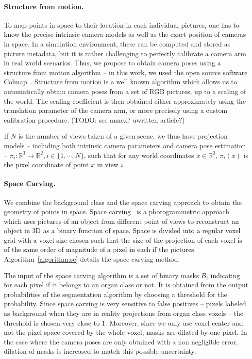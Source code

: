 \paragraph{Structure from motion.} To map points in space to their location in each
individual pictures, one has to know the precise intrinsic camera models as well
as the exact position of cameras in space. In a simulation environment,
these can be computed and stored as picture metadata, but it is rather
challenging to perfectly calibrate a camera arm in real world scenarios. Thus,
we propose to obtain camera poses using a structure from motion algorithm -- in
this work, we used the open source software Colmap~\cite{schoenberger2016mvs,
schoenberger2016sfm}. Structure from motion is a well known algorithm which
allows us to automatically obtain camera poses from a set of RGB pictures, up to
a scaling of the world. The scaling coefficient is then obtained either
approximately using the translation parameter of the camera arm, or more
precisely using a custom calibration procedure. (TODO: see annex? uwritten article?)

If $N$ is the number of views taken of a given scene,
we thus have projection models -- including both intrinsic camera parameters
and camera pose estimation -- $\pi_i : \mathbb{R}^3 \rightarrow \mathbb{R}^2,i \in \{1,\cdots, N\}$,
such that for any world coordinates $x \in \mathbb{R}^3$, $\pi_i ({x})$ is the
pixel coordinate of point ${x}$ in view $i$.

\paragraph{Space Carving.} We combine the background class and the space carving
approach to obtain the geometry of points in space. Space carving~\cite{kutulakos_theory_1999}
is a photogrammetric approach which uses
pictures of an object from different point of views to reconstruct
an object in 3D as a binary function of space. Space is divided into a regular voxel grid with a voxel size chosen
such that the size of the projection of each voxel is of the same order of magnitude of a pixel in each
if the pictures. Algorithm~\ref{algorithm:sc} details the space carving method.

The input of the space carving algorithm is a set of binary masks $B_i$
indicating for each pixel if it belongs to an organ class or not. It is
obtained from the output probabilities of the segmentation algorithm
by choosing a threshold for the probability. Since space carving is very
sensitive to false positives -- pixels labeled as background when they are in
reality projections from organ class voxels -- the threshold is chosen very
close to $1$. Moreover, since we only use voxel center and not the pixel space covered
by the whole voxel, masks are dilated by one pixel. In the case where
the camera poses are only obtained with a non negligible error,
dilation of masks is increased to match this possible uncertainty.

